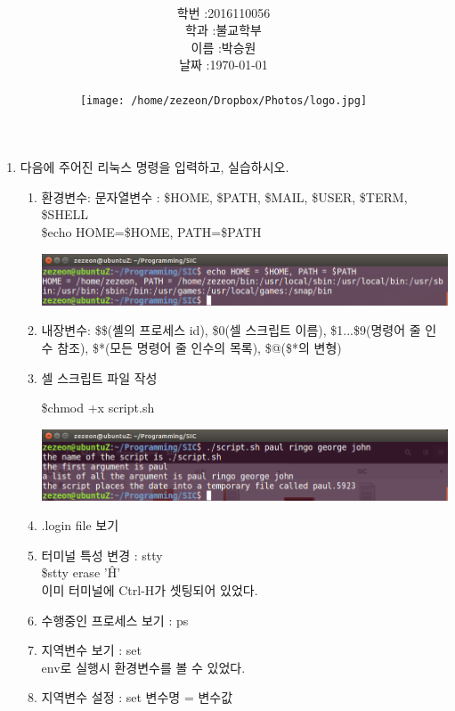 \documentclass[12pt,a4paper]{article}
\title{
	\centering
	\pgfornament[width=12cm,color=teal]{84}\\
	\vspace{1cm}
	\fontsize{50}{50} \selectfont {시스템 S/W 실습9}\\
	\pgfornament[width=12cm,color=teal]{88}\\
	\vfill}
\author{
	\LARGE
	\begin{tabular}{rl}
		\hline
		학번 : & 2016110056\\ 
		학과 : & 불교학부 \\
		이름 : & 박승원\\
		날짜 : & \today\\
		\hline
	\end{tabular}\vspace{2cm}
	\\
	\texttt{[image: /home/zezeon/Dropbox/Photos/logo.jpg]}
}
\date{}
\begin{document}
\maketitle
\newpage
\noindent
\lstset{columns=flexible, tabsize=4, frame=single, showstringspaces=false, breaklines=true, upquote=true}

\lstset{language=C++}
\begin{enumerate}
\item 다음에 주어진 리눅스 명령을 입력하고, 실습하시오.
\begin{enumerate}
	

\item 환경변수: 문자열변수 : \$HOME, \$PATH, \$MAIL, \$USER, \$TERM, \$SHELL\\

\$echo HOME=\$HOME, PATH=\$PATH

\includegraphics[width=\textwidth]{1.png}
\item 내장변수: \$\$(셸의 프로세스 id), \$0(셀 스크립트 이름), \$1...\$9(명령어 줄 인수 참조), \$*(모든 명령어 줄 인수의 목록), \$@(\$*의 변형)

\item 셀 스크립트 파일 작성


\$chmod +x script.sh

\includegraphics[width=\textwidth]{2.png}

\item .login file 보기



\item 터미널 특성 변경 : stty\\
\$stty erase '\^H'\\
이미 터미널에 Ctrl-H가 셋팅되어 있었다.
\item 수행중인 프로세스 보기 : ps

\item 지역변수 보기 : set\\
env로 실행시 환경변수를 볼 수 있었다.
\item 지역변수 설정 : set 변수명 = 변수값


\end{enumerate}
\end{enumerate}
\end{document}
